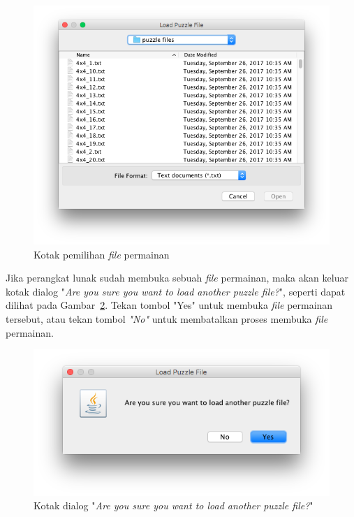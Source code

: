 \begin{enumerate}
\begin{figure}
\centering
\captionsetup{justification=centering}
\includegraphics[scale=0.5]{Gambar/ImplementasiPengujian/FileChooser.png}
\caption[Kotak pemilihan \textit{file} permainan]{Kotak pemilihan \textit{file} permainan}
\label{fig:filechooser}
\end{figure}

Jika perangkat lunak sudah membuka sebuah \textit{file} permainan, maka akan keluar kotak dialog "\textit{Are you sure you want to load another puzzle file?}", seperti dapat dilihat pada Gambar~\ref{fig:loadpuzzlefile}. Tekan tombol "Yes" untuk membuka \textit{file} permainan tersebut, atau tekan tombol \textit{"No"} untuk membatalkan proses membuka \textit{file} permainan.

\begin{figure}
\centering
\captionsetup{justification=centering}
\includegraphics[scale=0.5]{Gambar/ImplementasiPengujian/LoadPuzzleFile.png}
\caption[Kotak dialog "\textit{Are you sure you want to load another puzzle file?}"]{Kotak dialog "\textit{Are you sure you want to load another puzzle file?}"}
\label{fig:loadpuzzlefile}
\end{figure}


\end{enumerate}
